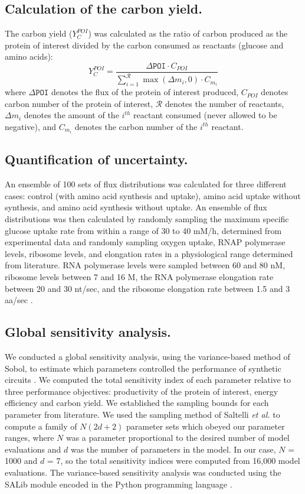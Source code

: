 \documentclass[journal=asbcd6,manuscript=article]{achemso}
\begin{document}
\subsection*{Calculation of the carbon yield.}
The carbon yield ($Y_{C}^{POI}$) was calculated as the ratio of carbon produced as the protein of interest divided by the carbon consumed as reactants (glucose and amino acids):
\begin{equation}\label{eqn:yield-definition}
	Y_{C}^{POI}=\frac{\Delta\texttt{POI}\cdot C_{POI}}{\displaystyle\sum_{i=1}^{\mathcal{R}}\max(\Delta m_{i},0)\cdot C_{m_i}}
\end{equation}
where $\Delta\texttt{POI}$ denotes the flux of the protein of interest produced, $C_{POI}$ denotes carbon number of the protein of interest, $\mathcal{R}$ denotes the number of reactants,
$\Delta m_{i}$ denotes the amount of the $i^{th}$ reactant consumed (never allowed to be negative), and $C_{m_i}$ denotes the carbon number of the $i^{th}$ reactant.


\subsection*{Quantification of uncertainty.}
An ensemble of 100 sets of flux distributions was calculated for three different cases: control (with amino acid synthesis and uptake), amino acid uptake without synthesis, and amino acid synthesis without uptake.
An ensemble of flux distributions was then calculated by randomly sampling the maximum specific glucose uptake rate from within a range of 30 to 40 mM/h, determined from experimental data and randomly sampling oxygen uptake, RNAP polymerase levels, ribosome levels, and elongation rates in a physiological range determined from literature.
RNA polymerase levels were sampled between 60 and 80 nM, ribosome levels between 7 and 16 \textmu M, the RNA polymerase elongation rate between 20 and 30 nt/sec, and the ribosome elongation rate between 1.5 and 3 aa/sec \cite{2005_underwood_biotech, Garamella:2016aa}.

\subsection*{Global sensitivity analysis.}
We conducted a global sensitivity analysis, using the variance-based method of Sobol, to estimate which parameters controlled the performance of synthetic circuits \citep{SOBOL_METHOD}.
We computed the total sensitivity index of each parameter relative to three performance objectives: productivity of the protein of interest, energy efficiency and carbon yield.
We established the sampling bounds for each parameter from literature.
We used the sampling method of Saltelli \textit{et al.} \citep{Saltelli:2010} to compute a family of $N\left(2d+2\right)$ parameter sets which obeyed our parameter ranges,
where $N$ was a parameter proportional to the desired number of model evaluations and $d$ was the number of parameters in the model. In our case, $N$ = 1000 and $d$ = 7, so the total sensitivity indices were computed from 16,000 model evaluations. The variance-based sensitivity analysis was conducted using the SALib module encoded in the Python programming language \citep{SALIB}.
\end{document}
